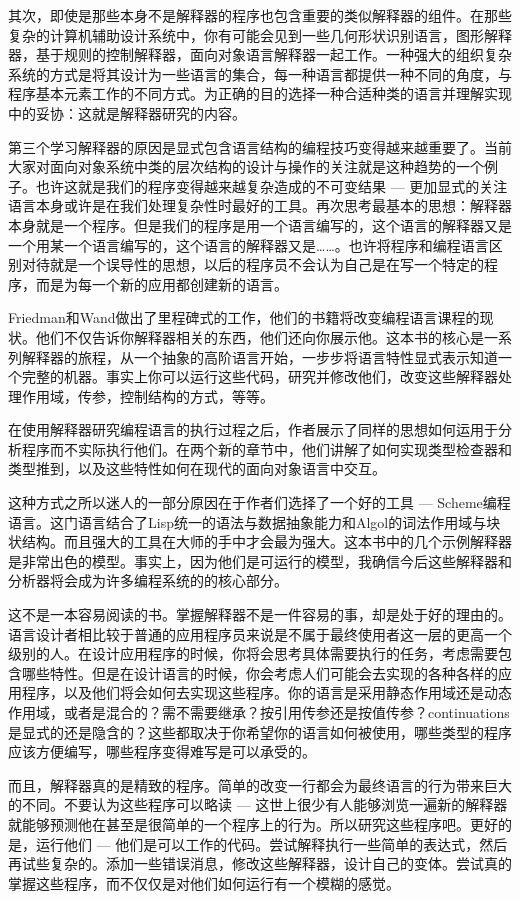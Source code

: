 其次，即使是那些本身不是解释器的程序也包含重要的类似解释器的组件。在那些复杂的计算机辅助设计系统中，你有可能会见到一些几何形状识别语言，图形解释器，基于规则的控制解释器，面向对象语言解释器一起工作。一种强大的组织复杂系统的方式是将其设计为一些语言的集合，每一种语言都提供一种不同的角度，与程序基本元素工作的不同方式。为正确的目的选择一种合适种类的语言并理解实现中的妥协：这就是解释器研究的内容。

第三个学习解释器的原因是显式包含语言结构的编程技巧变得越来越重要了。当前大家对面向对象系统中类的层次结构的设计与操作的关注就是这种趋势的一个例子。也许这就是我们的程序变得越来越复杂造成的不可变结果 --- 更加显式的关注语言本身或许是在我们处理复杂性时最好的工具。再次思考最基本的思想：解释器本身就是一个程序。但是我们的程序是用一个语言编写的，这个语言的解释器又是一个用某一个语言编写的，这个语言的解释器又是……。也许将程序和编程语言区别对待就是一个误导性的思想，以后的程序员不会认为自己是在写一个特定的程序，而是为每一个新的应用都创建新的语言。

Friedman和Wand做出了里程碑式的工作，他们的书籍将改变编程语言课程的现状。他们不仅告诉你解释器相关的东西，他们还向你展示他。这本书的核心是一系列解释器的旅程，从一个抽象的高阶语言开始，一步步将语言特性显式表示知道一个完整的机器。事实上你可以运行这些代码，研究并修改他们，改变这些解释器处理作用域，传参，控制结构的方式，等等。

在使用解释器研究编程语言的执行过程之后，作者展示了同样的思想如何运用于分析程序而不实际执行他们。在两个新的章节中，他们讲解了如何实现类型检查器和类型推到，以及这些特性如何在现代的面向对象语言中交互。

这种方式之所以迷人的一部分原因在于作者们选择了一个好的工具 --- Scheme编程语言。这门语言结合了Lisp统一的语法与数据抽象能力和Algol的词法作用域与块状结构。而且强大的工具在大师的手中才会最为强大。这本书中的几个示例解释器是非常出色的模型。事实上，因为他们是可运行的模型，我确信今后这些解释器和分析器将会成为许多编程系统的的核心部分。

这不是一本容易阅读的书。掌握解释器不是一件容易的事，却是处于好的理由的。语言设计者相比较于普通的应用程序员来说是不属于最终使用者这一层的更高一个级别的人。在设计应用程序的时候，你将会思考具体需要执行的任务，考虑需要包含哪些特性。但是在设计语言的时候，你会考虑人们可能会去实现的各种各样的应用程序，以及他们将会如何去实现这些程序。你的语言是采用静态作用域还是动态作用域，或者是混合的？需不需要继承？按引用传参还是按值传参？continuations是显式的还是隐含的？这些都取决于你希望你的语言如何被使用，哪些类型的程序应该方便编写，哪些程序变得难写是可以承受的。

而且，解释器真的是精致的程序。简单的改变一行都会为最终语言的行为带来巨大的不同。不要认为这些程序可以略读 --- 这世上很少有人能够浏览一遍新的解释器就能够预测他在甚至是很简单的一个程序上的行为。所以研究这些程序吧。更好的是，运行他们 --- 他们是可以工作的代码。尝试解释执行一些简单的表达式，然后再试些复杂的。添加一些错误消息，修改这些解释器，设计自己的变体。尝试真的掌握这些程序，而不仅仅是对他们如何运行有一个模糊的感觉。

